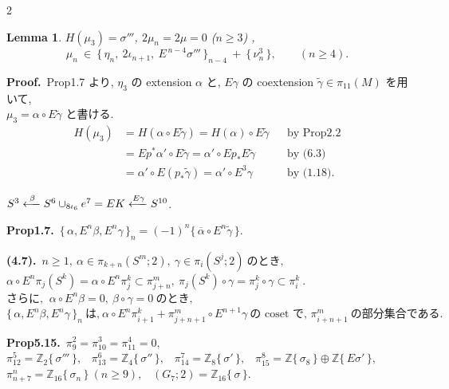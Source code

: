 \documentclass[10pt, leqno]{ltjsarticle}
\newcommand{\todai}[2][]{\{\,#2\,\}_{#1}}      %
\newcommand{\gen}[1]{\{\,#1\,\}}       %
\newcommand{\pis}[2]{\pi_{#1}(#2)}       %
\newcommand{\pit}[2]{\pi_{#1}^{#2}}
\newcommand{\coext}[1]{\widetilde{#1}}  %
\numberwithin{equation}{section}
\theoremstyle{plain}
\newtheorem{lemma}[theorem]{Lemma}
\theoremstyle{definition}
\theoremstyle{remark}
\begin{document}
\begin{paracol}{2}
\begin{lemma}\label{lem:6.5}
\(H(\mu_{3})=\sigma'''\), \quad
\(2\mu_{n}=2\mu=0\) (\(n\ge3\)) , 
\[
\mu_{n}\ \in\ \todai[n-4]{\eta_{n},\ 2\iota_{n+1},\ E^{\,n-4}\sigma'''}
\ +\ \gen{\nu^{3}_{n}},
\qquad (n\ge4).
\]
\end{lemma}

\noindent
\textbf{Proof.}\
Prop1.7 より, \(\eta_{3}\) の extension  \(\alpha\) と,
\(E\gamma\) の coextension  
\(\widetilde{\gamma}\in \pi_{11}(M)\) を用いて,\\
\(\mu_{3}=\alpha\circ E\widetilde{\gamma}\) と書ける. 
\[
\begin{align*}
  H(\mu_{3})
  & = H(\alpha\circ E\widetilde{\gamma})=H(\alpha)\circ E\widetilde{\gamma} 
  && \text{by Prop2.2}\\
  & = Ep^{\ast}\alpha'\circ E\widetilde{\gamma}
  = \alpha'\circ Ep_* E\coext{\gamma} 
  && \text{by (6.3)}\\
  & = \alpha'\circ E(p_*\coext{\gamma}) 
  = \alpha' \circ E^3\gamma 
  && \text{by (1.18)} .
\end{align*}
\]

\switchcolumn

\noindent
\(S^3\xlongleftarrow{\beta}
S^6\cup_{8\iota_6}e^7 = EK\xlongleftarrow{E\gamma}
S^{10}\).

\noindent
\textbf{Prop1.7.}\
\(\todai[n]{\alpha, E^n\beta, E^n\gamma}
= (-1)^n\gen{\overline{\alpha}\circ E^n\widetilde{\gamma}}\).

\noindent
\textbf{(4.7).}\
\(n\ge1, \ \alpha\in\pis{k+n}{S^m; 2},\ \gamma\in\pis{i}{S^j; 2}
\ \text{のとき, }\)\\
\(\alpha\circ E^n\pis{j}{S^k} = \alpha\circ E^n \pit{j}{k}
\subset \pit{j+n}{m},
\ \pis{j}{S^k}\circ\gamma = \pit{j}{k}\circ\gamma \subset\pit{i}{k}\ . \)\\
\(\text{さらに, }\ \alpha\circ E^n\beta=0,\ \beta\circ\gamma = 0 \ \text{のとき, }\)\\
\(\todai[n]{\alpha, E^n\beta, E^n\gamma}\ \text{は,}\
\alpha\circ E^n\pit{i+1}{k} + \pit{j+n+1}{m}\circ E^{n+1}\gamma\
\text{の coset で, }\pit{i+n+1}{m} \ \text{の部分集合である. }\)

\noindent
\textbf{Prop5.15.}\
\(\pi_9^2=\pi_{10}^3=\pi_{11}^4=0,\) \\
\(\pi^{5}_{12}=\mathbb Z_2\gen{\sigma'''},\) \
\(\pi^{6}_{13}=\mathbb Z_4\gen{\sigma''},\) \
\(\pi^{7}_{14}=\mathbb Z_8\gen{\sigma'},\) \
\(\pi^{8}_{15}=\mathbb Z\gen{\sigma_8}\oplus\mathbb Z\gen{E\sigma'},\) \\
\(\pi^{n}_{n+7}=\mathbb Z_{16}\gen{\sigma_n}\ (n\ge9),\) \
\((G_{7};2)=\mathbb Z_{16}\gen{\sigma}.\)


\end{paracol}
\end{document}

